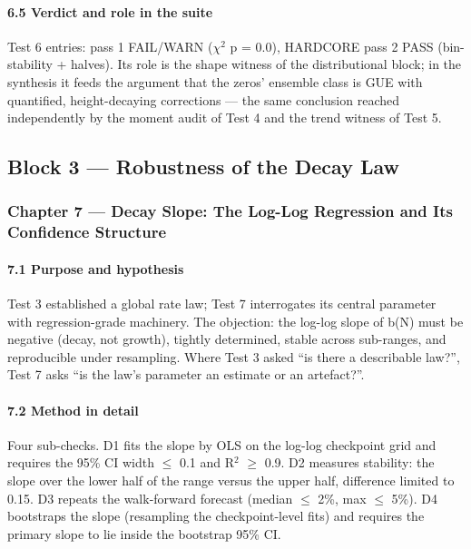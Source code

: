 \documentclass[10pt]{article}
\begin{document}
\paragraph{6.5 Verdict and role in the suite}

Test 6 entries: pass 1 FAIL/WARN ($\chi$$^2$ p = 0.0), HARDCORE pass 2 PASS (bin-stability + halves). Its role is the shape witness of the distributional block; in the synthesis it feeds the argument that the zeros' ensemble class is GUE with quantified, height-decaying corrections --- the same conclusion reached independently by the moment audit of Test 4 and the trend witness of Test 5.

\subsection{Block 3 --- Robustness of the Decay Law}

\subsubsection{Chapter 7 --- Decay Slope: The Log-Log Regression and Its Confidence Structure}

\paragraph{7.1 Purpose and hypothesis}

Test 3 established a global rate law; Test 7 interrogates its central parameter with regression-grade machinery. The objection: the log-log slope of b(N) must be negative (decay, not growth), tightly determined, stable across sub-ranges, and reproducible under resampling. Where Test 3 asked ``is there a describable law?'', Test 7 asks ``is the law's parameter an estimate or an artefact?''.

\paragraph{7.2 Method in detail}

Four sub-checks. D1 fits the slope by OLS on the log-log checkpoint grid and requires the 95\% CI width $\le$ 0.1 and R$^2$ $\ge$ 0.9. D2 measures stability: the slope over the lower half of the range versus the upper half, difference limited to 0.15. D3 repeats the walk-forward forecast (median $\le$ 2\%, max $\le$ 5\%). D4 bootstraps the slope (resampling the checkpoint-level fits) and requires the primary slope to lie inside the bootstrap 95\% CI.
\end{document}
